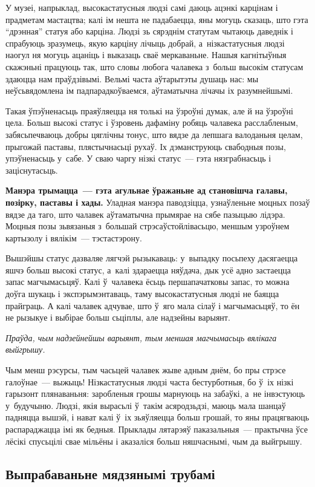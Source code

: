 У музеі, напрыклад, высокастатусныя людзі самі даюць ацэнкі карцінам і прадметам мастацтва; калі ім нешта не падабаецца, яны могуць сказаць, што гэта ``дрэнная'' статуя або карціна. Людзі зь сярэднім статутам чытаюць даведнік і спрабуюць зразумець, якую карціну лічыць добрай, а~нізкастатусныя людзі наогул ня могуць ацаніць і выказаць сваё меркаваньне. Нашыя кагнітыўныя скажэньні працуюць так, што словы любога чалавека з~больш высокім статусам здаюцца нам праўдзівымі. Вельмі часта аўтарытэты душаць нас: мы неўсьвядомлена ім падпарадкоўваемся, аўтаматычна лічачы іх разумнейшымі.

Такая ўпэўненасьць праяўляецца ня толькі на ўзроўні думак, але й на ўзроўні цела. Больш высокі статус і ўзровень дафаміну робяць чалавека расслабленым, забясьпечваюць добры цяглічны тонус, што вядзе да лепшага валоданьня целам, прыгожай паставы, плястычнасьці рухаў. Іх дэманструюць свабодныя позы, упэўненасьць у~сабе. У сваю чаргу нізкі статус~--- гэта нязграбнасьць і заціснутасьць.

\textbf{Манэра трымацца~--- гэта агульнае ўражаньне ад становішча галавы, позірку, паставы і хады.} Уладная манэра паводзіцца, узнаўленьне моцных позаў вядзе да таго, што чалавек аўтаматычна прымярае на сябе пазыцыю лідэра. Моцныя позы зьвязаныя з~большай стрэсаўстойлівасьцю, меншым узроўнем картызолу і вялікім~--- тэстастэрону.

Вышэйшы статус дазваляе лягчэй рызыкаваць: у~выпадку посьпеху дасягаецца яшчэ больш высокі статус, а~калі здараецца няўдача, дык усё адно застаецца запас магчымасьцяў. Калі ў~чалавека ёсьць першапачатковы запас, то можна доўга шукаць і экспэрымэнтаваць, таму высокастатусныя людзі не баяцца прайграць. А калі чалавек адчувае, што ў~яго мала сілаў і магчымасьцяў, то ён не рызыкуе і выбірае больш сьціплы, але надзейны варыянт. 

\emph{Праўда, чым надзейнейшы варыянт, тым меншая магчымасьць вялікага выйгрышу.}

Чым менш рэсурсы, тым часьцей чалавек жыве адным днём, бо пры стрэсе галоўнае~--- выжыць! Нізкастатусныя людзі часта бестурботныя, бо ў~іх нізкі гарызонт плянаваньня: заробленыя грошы марнуюць на забаўкі, а~не інвэстуюць у~будучыню. Людзі, якія вырасьлі ў~такім асяродзьдзі, маюць мала шанцаў падняцца вышэй, і нават калі ў~іх зьяўляецца больш грошай, то яны працягваюць распараджацца імі як бедныя. Прыклады лятарэяў паказальныя~--- практычна ўсе лёсікі спусьцілі свае мільёны і аказаліся больш няшчаснымі, чым да выйгрышу.

\subsection*{Выпрабаваньне мядзянымі трубамі}

